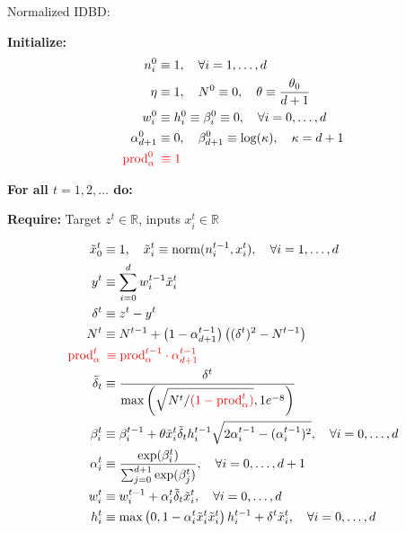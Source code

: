 \documentclass{article}
\begin{document}
	{\large Normalized IDBD:}
	
	\medskip
	
	\textbf{Initialize:}
	\begin{align*}
		n_i^0 & \equiv 1, \quad \forall i = 1, \dots, d \\
		\eta & \equiv 1, \quad N^0 \equiv 0, \quad \theta \equiv \frac{\theta_0}{d+1} \\
		w_i^0 & \equiv h_i^0 \equiv \beta_i^0 \equiv 0, \quad \forall i = 0, \dots, d \\
		\alpha_{d+1}^0 & \equiv 0, \quad \beta_{d+1}^0 \equiv \log(\kappa), \quad \kappa = d + 1 \\
		\textcolor{red}{\mathrm{prod}_\alpha^0} \,&\,\, \textcolor{red}{\equiv 1}
	\end{align*}
	
	\textbf{For all $t = 1, 2, \dots$ do:}
	
	\textbf{Require:} Target $z^t \in \mathbb{R}$, inputs $x_i^t \in \mathbb{R}$
	
	\begin{align}
		\tilde{x}_0^t & \equiv 1, \quad \tilde{x}_i^t \equiv \text{norm}(n_i^{t-1}, x_i^t), \quad \forall i = 1, \dots, d \\
		y^t & \equiv \sum_{i=0}^d w_i^{t-1} \tilde{x}_i^t \\
		\delta^t & \equiv z^t - y^t \\
		N^t & \equiv N^{t-1} + \left(1 - \alpha_{d+1}^{t-1}\right)\left( (\delta^t)^2 - N^{t-1} \right) \\
		\textcolor{red}{\mathrm{prod}_\alpha^t} \,&\,\, \textcolor{red}{\equiv \mathrm{prod}_\alpha^{t-1} \cdot \alpha_{d+1}^{t-1}} \\
		\tilde{\delta}_t & \equiv \frac{\delta^t}{\max\left( \sqrt{N^t/\textcolor{red}{(1 - \mathrm{prod}_\alpha^t)}}, 1e^{-8} \right)} \\
		\beta_i^t & \equiv \beta_i^{t-1} + \theta \tilde{x}_i^t \tilde{\delta}_t h_i^{t-1} \sqrt{2 \alpha_i^{t-1} - (\alpha_i^{t-1})^2}, \quad \forall i = 0, \dots, d \\
		\alpha_i^t & \equiv \frac{\exp(\beta_i^t)}{\sum_{j=0}^{d+1} \exp(\beta_j^t)}, \quad \forall i = 0, \dots, d+1 \\
			w_i^t & \equiv w_i^{t-1} + \alpha_i^t \tilde{\delta}_t \tilde{x}_i^t, \quad \forall i = 0, \dots, d\\
		h_i^t & \equiv \max\left( 0,1 - \alpha_i^t \tilde{x}_i^t \tilde{x}_i^t\right) h_i^{t-1} + \delta^t \tilde{x}_i^t, \quad \forall i = 0, \dots, d
	\end{align}
	
\end{document}
